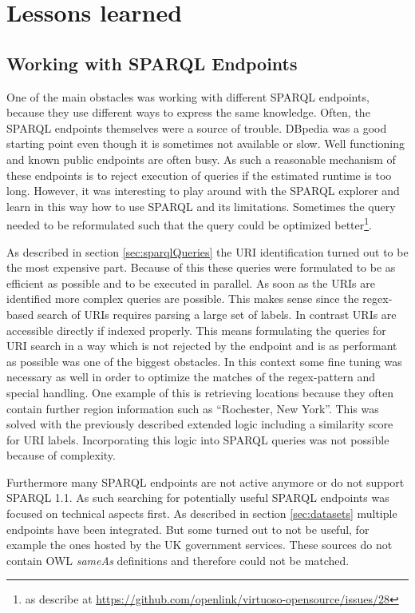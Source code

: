 \newpage
\section{Lessons learned}
\subsection{Working with SPARQL Endpoints}
One of the main obstacles was working with different SPARQL endpoints, because they use different ways to express the same knowledge. Often, the SPARQL endpoints themselves were a source of trouble. DBpedia was a good starting point even though it is sometimes not available or slow. Well functioning and known public endpoints are often busy. As such a reasonable mechanism of these endpoints is to reject execution of queries if the estimated runtime is too long. However, it was interesting to play around with the SPARQL explorer and learn in this way how to use SPARQL and its limitations. Sometimes the query needed to be reformulated such that the query could be optimized better\footnote{as describe at \url{https://github.com/openlink/virtuoso-opensource/issues/28}}.

As described in section \ref{sec:sparqlQueries} the URI identification turned out to be the most expensive part. Because of this  these queries were formulated to be as efficient as possible and to be executed in parallel. As soon as the URIs are identified more complex queries are possible. This makes sense since the regex-based search of URIs requires parsing a large set of labels. In contrast URIs are accessible directly if indexed properly. This means formulating the queries for URI search in a way which is not rejected by the endpoint and is as performant as possible was one of the biggest obstacles. In this context some fine tuning was necessary as well in order to optimize the matches of the regex-pattern and special handling. One example of this is retrieving locations because they often contain further region information such as ``Rochester, New York''. This was solved with the previously described extended logic including a similarity score for URI labels. Incorporating this logic into SPARQL queries was not possible because of complexity. 

Furthermore many SPARQL endpoints are not active anymore or do not support SPARQL 1.1. As such searching for potentially useful SPARQL endpoints was focused on technical aspects first. As described in section \ref{sec:datasets} multiple endpoints have been integrated. But some turned out to not be useful, for example the ones hosted by the UK government services. These sources do not contain OWL \textit{sameAs} definitions and therefore could not be matched.


